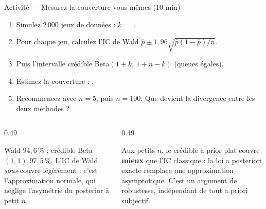 \begin{frame}{Activité --- Mesurez la couverture vous-mêmes (10 min)}
\begin{abox}
\begin{enumerate}
  \item Simulez 2\,000 jeux de données : $k = $ .
  \item Pour chaque jeu, calculez l'IC de Wald
        $\hat p \pm 1{,}96\sqrt{\hat p(1-\hat p)/n}$.
  \item Puis l'intervalle crédible Beta$(1+k,\,1+n-k)$ (queues égales).
  \item Estimez la couverture : .
  \item Recommencez avec $n = 5$, puis $n = 100$. Que devient la divergence entre
        les deux méthodes ?
\end{enumerate}
\end{abox}
\vspace{1mm}
\begin{columns}[t]
\begin{column}{0.49\textwidth}
\begin{solbox}[Résultats de référence ($n = 20$)]
Wald $94{,}6\,\%$ ; crédible Beta$(1,1)$ $97{,}5\,\%$.
L'IC de Wald \emph{sous}-couvre légèrement : c'est l'approximation normale, qui
néglige l'asymétrie du posterior à petit $n$.
\end{solbox}
\end{column}
\begin{column}{0.49\textwidth}
\begin{kbox}
Aux petits $n$, le crédible à prior plat couvre \textbf{mieux} que l'IC classique :
la loi a posteriori exacte remplace une approximation asymptotique. C'est un
argument de robustesse, indépendant de tout a priori subjectif.
\end{kbox}
\end{column}
\end{columns}
\end{frame}

